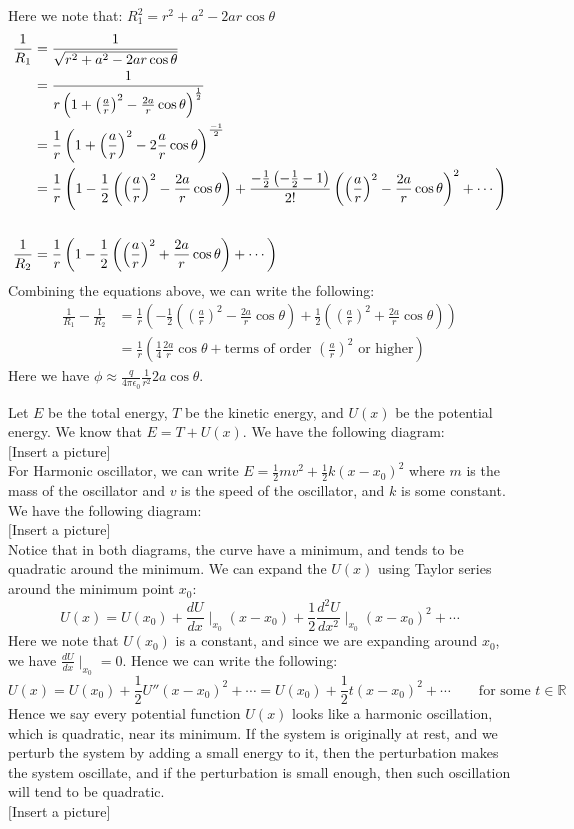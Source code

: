 \documentclass[11pt]{article}
\theoremstyle{break}
\theoremstyle{break}
\newcommand{\R}{\mathbb{R}}
\begin{document}
Here we note that: $R_1^2 = r^2+a^2 - 2ar\cos \theta$
\begin{align*}
\frac{1}{R_1} &= \frac{1}{\sqrt{r^2+a^2 - 2ar\cos \theta}}\\ &= \frac{1}{r\left(1+\left(\frac{a}{r}\right)^2-\frac{2a}{r}\cos\theta\right)^{\frac{1}{2}}}\\ &= \frac{1}{r}\left(1+\left(\frac{a}{r}\right)^2-2\frac{a}{r}\cos\theta\right)^{\frac{-1}{2}} \\&= \frac{1}{r}\left(1-\frac{1}{2}\left(\left(\frac{a}{r}\right)^2 - \frac{2a}{r}\cos\theta\right) + \frac{-\frac{1}{2}\left(-\frac{1}{2}-1\right)}{2!}\left(\left(\frac{a}{r}\right)^2-\frac{2a}{r}\cos\theta\right)^2 + \cdots \right)\\
\hfill\\
\frac{1}{R_2}&= \frac{1}{r}\left(1-\frac{1}{2}\left(\left(\frac{a}{r}\right)^2+\frac{2a}{r}\cos\theta\right)+\cdots\right)
\end{align*}
Combining the equations above, we can write the following:
\begin{align*}
\frac{1}{R_1}-\frac{1}{R_2} &= \frac{1}{r}\left(-\frac{1}{2}\left(\left(\frac{a}{r}\right)^2 - \frac{2a}{r}\cos\theta\right)+\frac{1}{2}\left(\left(\frac{a}{r}\right)^2+\frac{2a}{r}\cos\theta\right)\right)\\ &= \frac{1}{r}\left(\frac{1}{4}\frac{2a}{r}\cos\theta+\text{terms of order }\left(\frac{a}{r}\right)^2 \text{ or higher}\right)
\end{align*}
Here we have $\phi \approx \frac{q}{4\pi\epsilon_0}\frac{1}{r^2}2a\cos\theta$.
\newpage

Let $E$ be the total energy, $T$ be the kinetic energy, and $U(x)$ be the potential energy. We know that $E = T +U(x)$. We have the following diagram:\\
$[$Insert a picture$]$\\
For Harmonic oscillator, we can write $E = \frac{1}{2}mv^2 + \frac{1}{2}k(x-x_0)^2$ where $m$ is the mass of the oscillator and $v$ is the speed of the oscillator, and $k$ is some constant. We have the following diagram:\\
$[$Insert a picture$]$\\
Notice that in both diagrams, the curve have a minimum, and tends to be quadratic around the minimum. We can expand the $U(x)$ using Taylor series around the minimum point $x_0$:
$$U(x) = U(x_0) + \frac{dU}{dx}\mid_{x_0} (x-x_0) + \frac{1}{2}\frac{d^2U}{dx^2}\mid_{x_0} (x-x_0)^2 + \cdots$$
Here we note that $U(x_0)$ is a constant, and since we are expanding around $x_0$, we have $\frac{dU}{dx}\mid_{x_0} = 0$. Hence we can write the following:
$$U(x) = U(x_0) + \frac{1}{2}U''(x-x_0)^2 + \cdots = U(x_0) + \frac{1}{2}t(x-x_0)^2 +\cdots \qquad\text{for some }t \in \R$$
Hence we say every potential function $U(x)$ looks like a harmonic oscillation, which is quadratic, near its minimum. If the system is originally at rest, and we perturb the system by adding a small energy to it, then the perturbation makes the system oscillate, and if the perturbation is small enough, then such oscillation will tend to be quadratic.\\
$[$Insert a picture$]$\\
\end{document}
